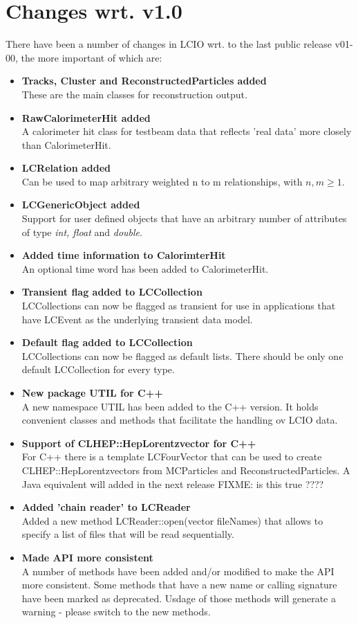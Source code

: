 \documentclass[twoside]{article}
\begin{document}
\section{Changes wrt. v1.0}
There have been a number of changes in LCIO wrt. to the last public release v01-00, the more important 
of which are:
\begin{itemize}
\item{{\bf Tracks, Cluster and ReconstructedParticles added} \\
These are the main classes for reconstruction output.
}
\item{{\bf RawCalorimeterHit added} \\
A calorimeter hit class for testbeam data that reflects 'real data' more closely than CalorimeterHit. 
}
\item{{\bf LCRelation added} \\
Can be used to map arbitrary weighted n to m relationships, with $n,m \ge 1$.
}
\item{{\bf LCGenericObject added} \\
Support for user defined objects that have an arbitrary number of attributes of type {\em int, float}
and {\it double}.
}
\item{{\bf Added time information to CalorimterHit} \\
An optional time word has been added to CalorimeterHit.
}
\item{{\bf Transient flag added to LCCollection} \\
LCCollections can now be flagged as transient for use in applications that have LCEvent as the
underlying transient data model.
}
\item{{\bf Default flag added to LCCollection} \\
LCCollections can now be flagged as default lists. There should be only one default LCCollection
for every type.
}
\item{{\bf  New package UTIL for C++} \\
A new namespace UTIL has been added to the C++ version. It holds convenient classes and methods
that facilitate the handling ov LCIO data.
}
\item{{\bf Support of CLHEP::HepLorentzvector for C++}\\
For C++ there is a template LCFourVector that can be used to create CLHEP::HepLorentzvectors
from MCParticles and ReconstructedParticles.
A Java equivalent will added in the next release FIXME: is this true ???? }
\item{{\bf Added 'chain reader' to LCReader} \\
Added a new method LCReader::open(vector fileNames) that allows to specify a list of files that
will be read sequentially. \\
}
\item{{\bf Made API more consistent} \\
A number of methods have been added and/or modified to make the API more consistent. Some methods
that have a new name or calling signature have been marked as deprecated. Usdage of those methods will
generate a warning - please switch to the new methods. 
}

\end{itemize}
\end{document}
